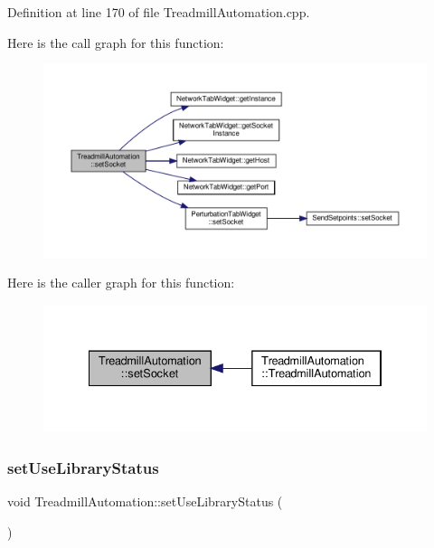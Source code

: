 Definition at line 170 of file Treadmill\+Automation.\+cpp.

Here is the call graph for this function\+:
\nopagebreak
\begin{figure}[H]
\begin{center}
\leavevmode
\includegraphics[width=350pt]{class_treadmill_automation_ab3509d1863460a2f8a419e067c3608a1_cgraph}
\end{center}
\end{figure}
Here is the caller graph for this function\+:
\nopagebreak
\begin{figure}[H]
\begin{center}
\leavevmode
\includegraphics[width=334pt]{class_treadmill_automation_ab3509d1863460a2f8a419e067c3608a1_icgraph}
\end{center}
\end{figure}
\mbox{\label{class_treadmill_automation_affefe22059a06d2113ea25c5a4277f8d}} 
\subsubsection{\texorpdfstring{set\+Use\+Library\+Status}{setUseLibraryStatus}}
{\footnotesize\ttfamily void Treadmill\+Automation\+::set\+Use\+Library\+Status (\begin{DoxyParamCaption}{ }\end{DoxyParamCaption})\hspace{0.3cm}{\ttfamily [slot]}}



